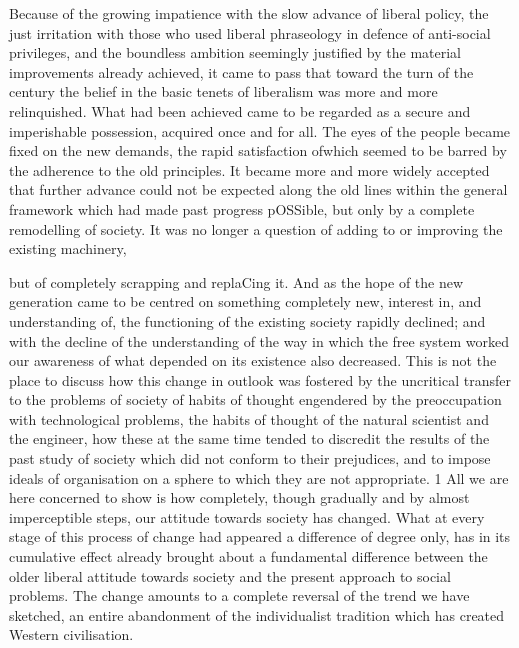 \documentclass[11pt,openany]{book}
\begin{document}
\begin{center}\textasteriskcentered\hspace{0.9em}\textasteriskcentered\hspace{0.9em}\textasteriskcentered\end{center}

\begin{center}\textasteriskcentered\hspace{0.9em}\textasteriskcentered\hspace{0.9em}\textasteriskcentered\end{center}

Because of the growing impatience with the slow advance of liberal policy, the just irritation with those who used liberal phraseology in defence of anti-social privileges, and the boundless ambition seemingly justified by the material improvements already achieved, it came to pass that toward the turn of the century the belief in the basic tenets of liberalism was more and more relinquished. What had been achieved came to be regarded as a secure and imperishable possession, acquired once and for all. The eyes of the people became fixed on the new demands, the rapid satisfaction ofwhich seemed to be barred by the adherence to the old principles. It became more and more widely accepted that further advance could not be expected along the old lines within the general framework which had made past progress pOSSible, but only by a complete remodelling of society. It was no longer a question of adding to or improving the existing machinery,

but of completely scrapping and replaCing it. And as the hope of the new generation came to be centred on something completely new, interest in, and understanding of, the functioning of the existing society rapidly declined; and with the decline of the understanding of the way in which the free system worked our awareness of what depended on its existence also decreased. This is not the place to discuss how this change in outlook was fostered by the uncritical transfer to the problems of society of habits of thought engendered by the preoccupation with technological problems, the habits of thought of the natural scientist and the engineer, how these at the same time tended to discredit the results of the past study of society which did not conform to their prejudices, and to impose ideals of organisation on a sphere to which they are not appropriate. 1 All we are here concerned to show is how completely, though gradually and by almost imperceptible steps, our attitude towards society has changed. What at every stage of this process of change had appeared a difference of degree only, has in its cumulative effect already brought about a fundamental difference between the older liberal attitude towards society and the present approach to social problems. The change amounts to a complete reversal of the trend we have sketched, an entire abandonment of the individualist tradition which has created Western civilisation.
\end{document}
